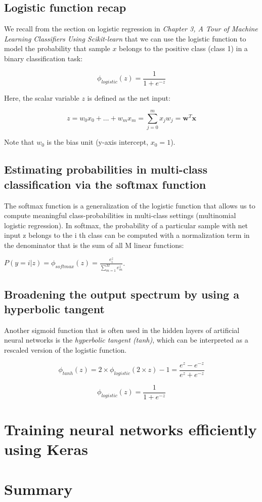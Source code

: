 \documentclass[letterpaper]{report}
\begin{document}
\subsection{Logistic function recap}

We recall from the section on logistic regression in \textit{Chapter 3, A Tour of Machine Learning Classifiers Using Scikit-learn} that we can use the logistic function to model the probability that sample $x$ belongs to the positive class (class 1) in a binary classification task:

\[ 
\phi_{logistic} (z) = \frac{1}{1 + e^{-z}}
\]

Here, the scalar variable $z$ is defined as the net input:

\[
z = w_0 x_0 + \dots + w_m x_m = \sum_{j=0}^{m} x_j w_j = \mathbf{w}^T \mathbf{x}
\]

Note that $w_0$ is the bias unit (y-axis intercept, $x_0 =1$).

\subsection{Estimating probabilities in multi-class classification via the softmax function}

The softmax function is a generalization of the logistic function that allows us
to compute meaningful class-probabilities in multi-class settings (multinomial logistic regression). In softmax, the probability of a particular sample with net input z belongs to the i th class can be computed with a normalization term in the denominator that is the sum of all M linear functions:

$P(y=i | z) = \phi_{softmax}(z) = \frac{e_{i}^{z}}{\sum_{m=1}^{M} e_{m}^{z}}$.

\subsection{Broadening the output spectrum by using a hyperbolic tangent}

Another sigmoid function that is often used in the hidden layers of artificial neural networks is the \textit{hyperbolic tangent (tanh)}, which can be interpreted as a rescaled version of the logistic function.

\[
\phi_{tanh} (z) = 2 \times \phi_{logistic} (2 \times z) - 1 = \frac{e^{z} - e^{-z} }{e^{z} + e^{-z}}
\]

\[
\phi_{logistic}(z) = \frac{1}{1 + e^{-z}}
\]

\section{Training neural networks efficiently using Keras}
\section{Summary}
\end{document}
